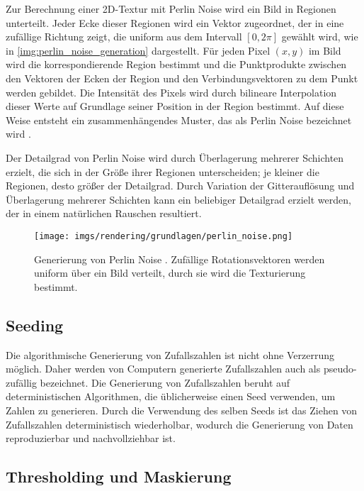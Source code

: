 Zur Berechnung einer 2D-Textur mit Perlin Noise wird ein Bild in Regionen unterteilt. Jeder Ecke dieser Regionen wird ein Vektor zugeordnet, der in eine zufällige Richtung zeigt, die uniform aus dem Intervall $[0, 2\pi]$ gewählt wird, wie in \autoref{img:perlin_noise_generation} dargestellt. Für jeden Pixel $(x, y)$ im Bild wird die korrespondierende Region bestimmt und die Punktprodukte zwischen den Vektoren der Ecken der Region und den Verbindungsvektoren zu dem Punkt werden gebildet. Die Intensität des Pixels wird durch bilineare Interpolation dieser Werte auf Grundlage seiner Position in der Region bestimmt. Auf diese Weise entsteht ein zusammenhängendes Muster, das als Perlin Noise bezeichnet wird \cite{perlin_noise_original}.

Der Detailgrad von Perlin Noise wird durch Überlagerung mehrerer Schichten erzielt, die sich in der Größe ihrer Regionen unterscheiden; je kleiner die Regionen, desto größer der Detailgrad. Durch Variation der Gitterauflösung und Überlagerung mehrerer Schichten kann ein beliebiger Detailgrad erzielt werden, der in einem natürlichen Rauschen resultiert.

\begin{figure}
    \centering
    \texttt{[image: imgs/rendering/grundlagen/perlin\_noise.png]}
    \caption{Generierung von Perlin Noise \cite{perlin_noise_img}. Zufällige Rotationsvektoren werden uniform über ein Bild verteilt, durch sie wird die Texturierung bestimmt.}
    \label{img:perlin_noise_generation}
\end{figure}

\subsection{Seeding}

Die algorithmische Generierung von Zufallszahlen ist nicht ohne Verzerrung möglich. Daher werden von Computern generierte Zufallszahlen auch als pseudo-zufällig bezeichnet. Die Generierung von Zufallszahlen beruht auf deterministischen Algorithmen, die üblicherweise einen Seed verwenden, um Zahlen zu generieren. Durch die Verwendung des selben Seeds ist das Ziehen von Zufallszahlen deterministisch wiederholbar, wodurch die Generierung von Daten reproduzierbar und nachvollziehbar ist.

\subsection{Thresholding und Maskierung}

